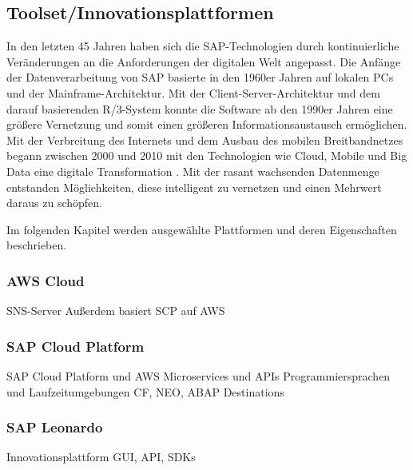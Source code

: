 \subsection{Toolset/Innovationsplattformen}
In den letzten 45 Jahren haben sich die SAP-Technologien durch kontinuierliche Veränderungen an die Anforderungen der digitalen Welt angepasst.
Die Anfänge der Datenverarbeitung von SAP basierte in den 1960er Jahren auf lokalen PCs und der Mainframe-Architektur.
Mit der Client-Server-Architektur und dem darauf basierenden R/3-System konnte die Software ab den 1990er Jahren eine größere
Vernetzung und somit einen größeren Informationsaustausch ermöglichen. Mit der Verbreitung des Internets und dem Ausbau des mobilen
Breitbandnetzes begann zwischen 2000 und 2010 mit den Technologien wie Cloud, Mobile und Big Data eine digitale Transformation \citep[S. 44]{Elsner2018}.
Mit der rasant wachsenden Datenmenge entstanden Möglichkeiten, diese intelligent zu vernetzen und einen Mehrwert daraus zu schöpfen.

\par Im folgenden Kapitel werden ausgewählte Plattformen und deren Eigenschaften beschrieben.
\subsubsection{AWS Cloud}
SNS-Server
Außerdem basiert SCP auf AWS
\subsubsection{SAP Cloud Platform}

SAP Cloud Platform und AWS Microservices und APIs
Programmiersprachen und Laufzeitumgebungen
CF, NEO, ABAP
Destinations

\subsubsection{SAP Leonardo}

Innovationsplattform
GUI, API, SDKs



\newpage
